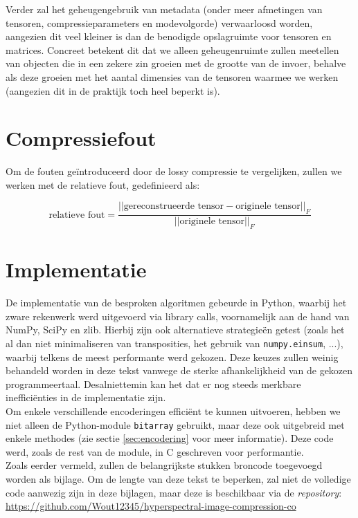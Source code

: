 Verder zal het geheugengebruik van metadata (onder meer afmetingen van tensoren, compressieparameters en modevolgorde) verwaarloosd worden, aangezien dit veel kleiner is dan de benodigde opslagruimte voor tensoren en matrices. Concreet betekent dit dat we alleen geheugenruimte zullen meetellen van objecten die in een zekere zin groeien met de grootte van de invoer, behalve als deze groeien met het aantal dimensies van de tensoren waarmee we werken (aangezien dit in de praktijk toch heel beperkt is).

\section{Compressiefout}

Om de fouten ge\"introduceerd door de lossy compressie te vergelijken, zullen we werken met de relatieve fout, gedefinieerd als:

\[
\text{relatieve fout} = \frac{||\text{gereconstrueerde tensor} - \text{originele tensor}||_F}{||\text{originele tensor}||_F}
\]

\section{Implementatie}

De implementatie van de besproken algoritmen gebeurde in Python, waarbij het zware rekenwerk werd uitgevoerd via library calls, voornamelijk aan de hand van NumPy, SciPy en zlib. Hierbij zijn ook alternatieve strategie\"en getest (zoals het al dan niet minimaliseren van transposities, het gebruik van \texttt{numpy.einsum}, ...), waarbij telkens de meest performante werd gekozen. Deze keuzes zullen weinig behandeld worden in deze tekst vanwege de sterke afhankelijkheid van de gekozen programmeertaal. Desalniettemin kan het dat er nog steeds merkbare ineffici\"enties in de implementatie zijn.\\

Om enkele verschillende encoderingen effici\"ent te kunnen uitvoeren, hebben we niet alleen de Python-module \texttt{bitarray} \cite{ref:bitarray} gebruikt, maar deze ook uitgebreid met enkele methodes (zie sectie \ref{sec:encodering} voor meer informatie). Deze code werd, zoals de rest van de module, in C geschreven voor performantie.\\

Zoals eerder vermeld, zullen de belangrijkste stukken broncode toegevoegd worden als bijlage. Om de lengte van deze tekst te beperken, zal niet de volledige code aanwezig zijn in deze bijlagen, maar deze is beschikbaar via de \textit{repository}: \url{https://github.com/Wout12345/hyperspectral-image-compression-co}

